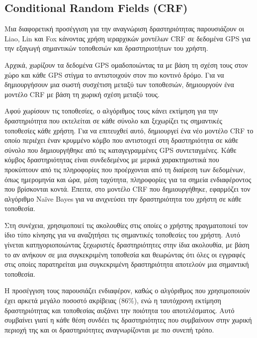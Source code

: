 \documentclass[12pt,twoside,openright]{report}
\begin{document}
\subsection[\lt Conditional Random Fields (CRF) \gt]{\lt Conditional Random Fields (CRF)\gt}
Μια διαφορετική προσέγγιση για την αναγνώριση δραστηριότητας παρουσιάζουν οι \lt Liao, Lin \gt και \lt Fox \gt κάνοντας χρήση ιεραρχικών μοντέλων \lt CRF \gt σε δεδομένα \lt GPS \gt για την εξαγωγή σημαντικών τοποθεσιών και δραστηριοτήτων του χρήστη. 

Αρχικά, χωρίζουν τα δεδομένα \lt GPS \gt ομαδοποιώντας τα με βάση τη σχέση τους στον χώρο και κάθε \lt GPS \gt στίγμα το αντιστοιχούν στον πιο κοντινό δρόμο. Για να δημιουργήσουν μια σωστή συσχέτιση μεταξύ των τοποθεσιών, δημιουργούν ένα μοντέλο \lt CRF \gt με βάση τη χωρική σχέση μεταξύ τους.

Αφού χωρίσουν τις τοποθεσίες, ο αλγόριθμος τους κάνει εκτίμηση για την δραστηριότητα που εκτελείται σε κάθε σύνολο και ξεχωρίζει τις σημαντικές τοποθεσίες κάθε χρήστη. Για να επιτευχθεί αυτό, δημιουργεί ένα νέο μοντέλο \lt CRF \gt το οποίο περιέχει έναν κρυμμένο κόμβο που αντιστοιχεί στη δραστηριότητα σε κάθε σύνολο που δημιουργήθηκε από τις καταγεγραμμένες \lt GPS \gt συντεταγμένες. Κάθε κόμβος δραστηριότητας είναι συνδεδεμένος με μερικά χαρακτηριστικά που προκύπτουν από τις πληροφορίες που προέρχονται από τη διαίρεση των δεδομένων, όπως ημερομηνία και ώρα, μέση ταχύτητα, πληροφορίες για τα σημεία ενδιαφέροντος που βρίσκονται κοντά. Έπειτα, στο μοντέλο \lt CRF \gt που δημιουργήθηκε, εφαρμόζει τον αλγόριθμο \lt Naïve Bayes \gt για να ανιχνεύσει την δραστηριότητα του χρήστη σε κάθε τοποθεσία. 

Στη συνέχεια, χρησιμοποιεί τις ακολουθίες στις οποίες ο χρήστης πραγματοποιεί τον ίδιο τύπο κίνησης για να αναζητήσει τις σημαντικές τοποθεσίες του χρήστη. Αυτό γίνεται κατηγοριοποιώντας ξεχωριστές δραστηριότητες στην ίδια ακολουθία, με βάση το αν ανήκουν σε μια συγκεκριμένη τοποθεσία και θεωρώντας ότι όλες οι εγγραφές στις οποίες παρατηρείται μια συγκεκριμένη δραστηριότητα αποτελούν μια σημαντική τοποθεσία. 

Η προσέγγιση τους παρουσιάζει ενδιαφέρον, καθώς ο αλγόριθμος που χρησιμοποιούν έχει αρκετά μεγάλο ποσοστό ακρίβειας (86\%), ενώ η ταυτόχρονη εκτίμηση δραστηριότητας και τοποθεσίας αυξάνει την ποιότητα του αποτελέσματος. Αυτό συμβαίνει γιατί η κάθε θέση συνδέει τις δραστηριότητες που συμβαίνουν στην χωρική περιοχή της και οι δραστηριότητες αναγνωρίζονται με πιο συνεπή τρόπο.\cite{Liao:2007}
\end{document}
